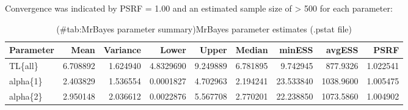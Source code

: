 \documentclass[]{book}
\theoremstyle{definition}
\theoremstyle{definition}
\theoremstyle{definition}
\theoremstyle{remark}
\begin{document}
Convergence was indicated by PSRF = 1.00 and an estimated sample size of
\textgreater{} 500 for each parameter:

\begin{table}

\caption{(\#tab:MrBayes parameter summary)MrBayes parameter estimates (.pstat file)}
\centering
\begin{tabular}[t]{l|r|r|r|r|r|r|r|r}
\hline
Parameter & Mean & Variance & Lower & Upper & Median & minESS & avgESS & PSRF\\
\hline
TL\{all\} & 6.708892 & 1.624940 & 4.8329690 & 9.249889 & 6.781895 & 9.742945 & 877.9326 & 1.022541\\
\hline
alpha\{1\} & 2.403829 & 1.536554 & 0.0001827 & 4.702963 & 2.194241 & 23.533840 & 1038.9600 & 1.005475\\
\hline
alpha\{2\} & 2.950148 & 2.036612 & 0.0022876 & 5.567708 & 2.770201 & 22.238850 & 1073.5860 & 1.004902\\
\hline
\end{tabular}
\end{table}


\end{document}
